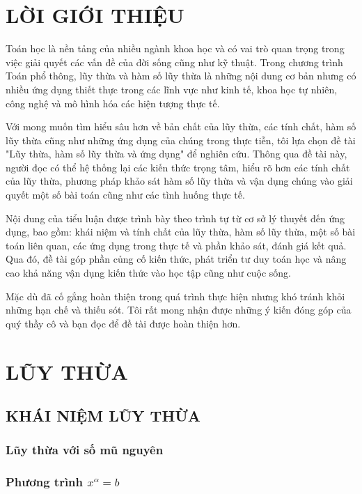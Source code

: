 \documentclass{article}
\begin{document}
\section*{LỜI GIỚI THIỆU} 

Toán học là nền tảng của nhiều ngành khoa học và có vai trò quan trọng trong việc giải quyết các vấn đề của đời sống cũng như kỹ thuật. Trong chương trình Toán phổ thông, lũy thừa và hàm số lũy thừa là những nội dung cơ bản nhưng có nhiều ứng dụng thiết thực trong các lĩnh vực như kinh tế, khoa học tự nhiên, công nghệ và mô hình hóa các hiện tượng thực tế.

Với mong muốn tìm hiểu sâu hơn về bản chất của lũy thừa, các tính chất, hàm số lũy thừa cũng như những ứng dụng của chúng trong thực tiễn, tôi lựa chọn đề tài "Lũy thừa, hàm số lũy thừa và ứng dụng" để nghiên cứu. Thông qua đề tài này, người đọc có thể hệ thống lại các kiến thức trọng tâm, hiểu rõ hơn các tính chất của lũy thừa, phương pháp khảo sát hàm số lũy thừa và vận dụng chúng vào giải quyết một số bài toán cũng như các tình huống thực tế.

Nội dung của tiểu luận được trình bày theo trình tự từ cơ sở lý thuyết đến ứng dụng, bao gồm: khái niệm và tính chất của lũy thừa, hàm số lũy thừa, một số bài toán liên quan, các ứng dụng trong thực tế và phần khảo sát, đánh giá kết quả. Qua đó, đề tài góp phần củng cố kiến thức, phát triển tư duy toán học và nâng cao khả năng vận dụng kiến thức vào học tập cũng như cuộc sống.

Mặc dù đã cố gắng hoàn thiện trong quá trình thực hiện nhưng khó tránh khỏi những hạn chế và thiếu sót. Tôi rất mong nhận được những ý kiến đóng góp của quý thầy cô và bạn đọc để đề tài được hoàn thiện hơn.

\newpage

\tableofcontents
\newpage

\section{LŨY THỪA}

\subsection{KHÁI NIỆM LŨY THỪA}

\subsubsection{Lũy thừa với số mũ nguyên}
\subsubsection{Phương trình $x^{\alpha} = b$}
\end{document}
